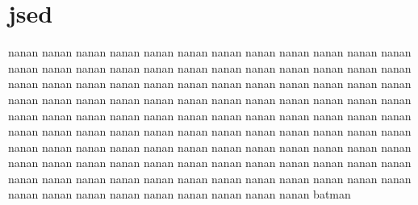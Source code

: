 \documentclass[11pt,a4paper,draft]{report}
\begin{document}
\section{jsed}

nanan nanan nanan nanan nanan nanan nanan nanan nanan nanan nanan nanan nanan
nanan nanan nanan nanan nanan nanan nanan nanan nanan nanan nanan nanan nanan
nanan nanan nanan nanan nanan nanan nanan nanan nanan nanan nanan nanan nanan
nanan nanan nanan nanan nanan nanan nanan nanan nanan nanan nanan nanan nanan
nanan nanan nanan nanan nanan nanan nanan nanan nanan nanan nanan nanan nanan
nanan nanan nanan nanan nanan nanan nanan nanan nanan nanan nanan nanan nanan
nanan nanan nanan nanan nanan nanan nanan nanan nanan nanan nanan nanan nanan
nanan nanan nanan nanan nanan nanan nanan nanan nanan nanan nanan nanan nanan
nanan nanan nanan nanan nanan nanan nanan nanan nanan nanan nanan nanan nanan
batman
\end{document}
